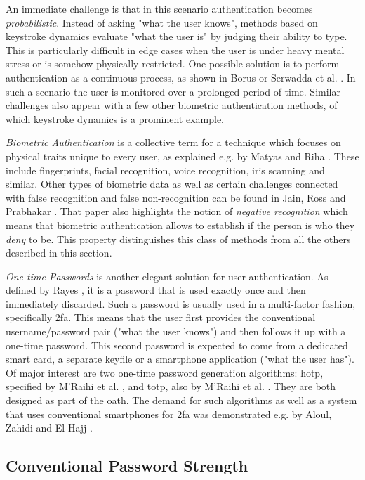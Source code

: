 An immediate challenge is that in this scenario authentication becomes \emph{probabilistic}. Instead of asking "what the user knows", methods based on keystroke dynamics evaluate "what the user is" by judging their ability to type. This is particularly difficult in edge cases when the user is under heavy mental stress or is somehow physically restricted. One possible solution is to perform authentication as a continuous process, as shown in Borus \cite{bours2012continuous} or Serwadda et al. \cite{serwadda2013scan}. In such a scenario the user is monitored over a prolonged period of time. Similar challenges also appear with a few other biometric authentication methods, of which keystroke dynamics is a prominent example.

\emph{Biometric Authentication} is a collective term for a technique which focuses on physical traits unique to every user, as explained e.g. by Matyas and Riha \cite{matyas:2003:toward}. These include fingerprints, facial recognition, voice recognition, iris scanning and similar. Other types of biometric data as well as certain challenges connected with false recognition and false non-recognition can be found in Jain, Ross and Prabhakar \cite{jain:2004:intro-to-biometric}. That paper also highlights the notion of \emph{negative recognition} which means that biometric authentication allows to establish if the person is who they \emph{deny} to be. This property distinguishes this class of methods from all the others described in this section.

\emph{One-time Passwords} is another elegant solution for user authentication. As defined by Rayes \cite{rayes:2005:otp}, it is a password that is used exactly once and then immediately discarded. Such a password is usually used in a multi-factor fashion, specifically \gls{2fa}. This means that the user first provides the conventional username/password pair ("what the user knows") and then follows it up with a one-time password. This second password is expected to come from a dedicated smart card, a separate keyfile or a smartphone application ("what the user has"). Of major interest are two one-time password generation algorithms: \gls{hotp}, specified by M’Raihi et al. \cite{rfc4226}, and \gls{totp}, also by M’Raihi et al. \cite{rfc6238}. They are both designed as part of the \gls{oath}. The demand for such algorithms as well as a system that uses conventional smartphones for \gls{2fa} was demonstrated e.g. by
Aloul, Zahidi and El-Hajj \cite{aloul:2009:two-factor-auth}.

\subsection{Conventional Password Strength}
\label{sec:password-strength}

